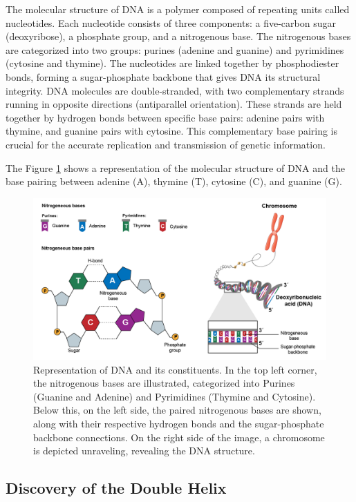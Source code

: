The molecular structure of DNA is a polymer composed of repeating units called nucleotides. Each nucleotide consists of three components: a five-carbon sugar (deoxyribose), a phosphate group, and a nitrogenous base. The nitrogenous bases are categorized into two groups: purines (adenine and guanine) and pyrimidines (cytosine and thymine). The nucleotides are linked together by phosphodiester bonds, forming a sugar-phosphate backbone that gives DNA its structural integrity. DNA molecules are double-stranded, with two complementary strands running in opposite directions (antiparallel orientation). These strands are held together by hydrogen bonds between specific base pairs: adenine pairs with thymine, and guanine pairs with cytosine. This complementary base pairing is crucial for the accurate replication and transmission of genetic information. \cite{Minchin2019}

The Figure \ref{fig:DNA} shows a representation of the molecular structure of DNA and the base pairing between adenine (A), thymine (T), cytosine (C), and guanine (G).

\begin{figure}[H]
    \centering
    \includegraphics[width=1\textwidth]{figs/DNA.png}
    \caption{Representation of DNA and its constituents. In the top left corner, the nitrogenous bases are illustrated, categorized into Purines (Guanine and Adenine) and Pyrimidines (Thymine and Cytosine). Below this, on the left side, the paired nitrogenous bases are shown, along with their respective hydrogen bonds and the sugar-phosphate backbone connections. On the right side of the image, a chromosome is depicted unraveling, revealing the DNA structure. \cite{DNA}} 
    \label{fig:DNA}
\end{figure}

\subsection{Discovery of the Double Helix}

